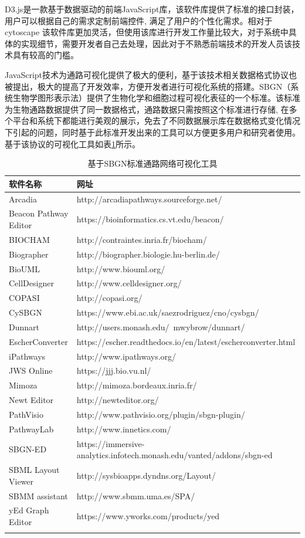 D3.js\cite{bostock2012d3}是一款基于数据驱动的前端JavaScript库，该软件库提供了标准的接口封装，用户可以根据自己的需求定制前端控件, 满足了用户的个性化需求。相对于cytoscape 该软件库更加灵活，但使用该库进行开发工作量比较大，对于系统中具体的实现细节，需要开发者自己去处理，因此对于不熟悉前端技术的开发人员该技术具有较高的门槛。

JavaScript技术为通路可视化提供了极大的便利，基于该技术相关数据格式协议也被提出，极大的提高了开发效率，方便开发者进行可视化系统的搭建。SBGN\cite{le2009systems}（系统生物学图形表示法）提供了生物化学和细胞过程可视化表征的一个标准。该标准为生物通路数据提供了同一数据格式，通路数据只需按照这个标准进行存储, 在多个平台和系统下都能进行美观的展示，免去了不同数据展示库在数据格式变化情况下引起的问题，同时基于此标准开发出来的工具可以方便更多用户和研究者使用。基于该协议的可视化工具如表\ref{sbgn}所示。

\begin{table}[htbp]
  \centering
	\caption[table2]{基于SBGN标准通路网络可视化工具}
\vspace{0.5em}\wuhao
\begin{tabularx}{1.0\textwidth}{lX}
\toprule[1.5pt]
软件名称 & 网址 \\
\midrule[1pt]
Arcadia	 &  http://arcadiapathways.sourceforge.net/\\
Beacon Pathway Editor	 & https://bioinformatics.cs.vt.edu/beacon/\\
BIOCHAM	 & http://contraintes.inria.fr/biocham/\\
Biographer	 & http://biographer.biologie.hu-berlin.de/\\
BioUML	& http://www.biouml.org/\\
CellDesigner & http://www.celldesigner.org/\\
COPASI	& http://copasi.org/\\
CySBGN	 & https://www.ebi.ac.uk/saezrodriguez/cno/cysbgn/\\
Dunnart	 & http://users.monash.edu/~mwybrow/dunnart/\\
EscherConverter		& https://escher.readthedocs.io/en/latest/escherconverter.html\\
iPathways	 & http://www.ipathways.org/\\
JWS Online	& https://jjj.bio.vu.nl/\\
Mimoza	 & http://mimoza.bordeaux.inria.fr/\\
Newt Editor	& http://newteditor.org/\\
PathVisio	& http://www.pathvisio.org/plugin/sbgn-plugin/\\
PathwayLab	& http://www.innetics.com/\\
SBGN-ED	  & https://immersive-analytics.infotech.monash.edu/vanted/addons/sbgn-ed \\
SBML Layout Viewer	 & http://sysbioapps.dyndns.org/Layout/\\
SBMM assistant	 & http://www.sbmm.uma.es/SPA/\\
yEd Graph Editor	& https://www.yworks.com/products/yed\\

\bottomrule[1.5pt]
\label{sbgn}
\end{tabularx}
\end{table}

